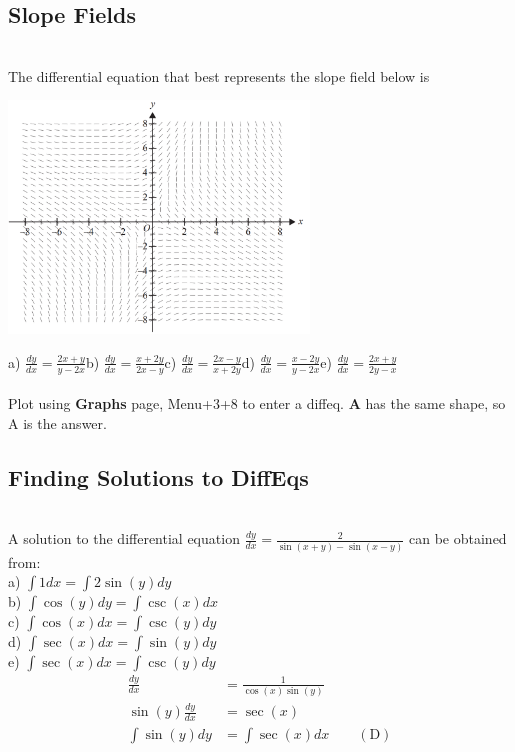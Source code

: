 \documentclass[a4paper,twoside]{article}
\newenvironment{examquestion}[1]{%
	\mbox{}\\\tcolorbox[beamer,breakable,%
	title=Exam-style Question: #1,standard jigsaw,opacityback=0, colframe=red!75!black]}{\endtcolorbox\mbox{}\\}
\begin{document}
		\subsection{Slope Fields}
			\begin{examquestion}{2018 Exam 2 Question A10}
				The differential equation that best represents the slope field below is
				\begin{center}
					\includegraphics[width=8cm]{2018-2A10.png}\\
				\end{center}
				a) $\displaystyle \frac{dy}{dx}=\frac{2x+y}{y-2x}$\qquad b) $\displaystyle \frac{dy}{dx}=\frac{x+2y}{2x-y}$\qquad c) $\displaystyle \frac{dy}{dx}=\frac{2x-y}{x+2y}$\qquad d) $\displaystyle \frac{dy}{dx}=\frac{x-2y}{y-2x}$\qquad e) $\displaystyle \frac{dy}{dx}=\frac{2x+y}{2y-x}$\\\\
				Plot using \textbf{Graphs} page, Menu+3+8 to enter a diffeq. \textbf{A} has the same shape, so A is the answer.
			\end{examquestion}
		\subsection{Finding Solutions to DiffEqs}
			\begin{examquestion}{2018 Exam 2 Question A9}
				A solution to the differential equation $\displaystyle \frac{dy}{dx}=\frac{2}{\sin(x+y)-\sin(x-y)}$ can be obtained from:\\
				a) $\displaystyle \int1dx=\int2\sin(y)dy$\\
				b) $\displaystyle \int\cos(y)dy=\int\csc(x)dx$\\
				c) $\displaystyle \int\cos(x)dx=\int\csc(y)dy$\\
				d) $\displaystyle \int\sec(x)dx=\int\sin(y)dy$\\
				e) $\displaystyle \int\sec(x)dx=\int\csc(y)dy$\\
				\begin{align*}
					\frac{dy}{dx}&=\frac{1}{\cos(x)\sin(y)} \\
					\sin(y)\frac{dy}{dx}&=\sec(x) \\
					\int\sin(y)dy&=\int\sec(x)dx \qquad \mathrm{(D)}
				\end{align*}
			\end{examquestion}
\end{document}
